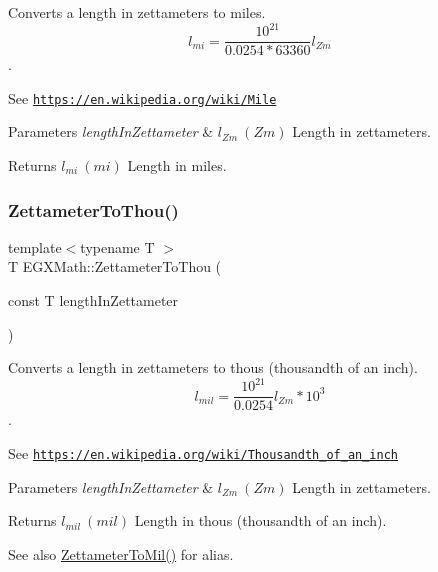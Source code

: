 Converts a length in zettameters to miles. \[ l_{mi}=\frac{10^{21}}{0.0254 * 63360} l_{Zm} \]. 

See \href{https://en.wikipedia.org/wiki/Mile}{\tt https\+://en.\+wikipedia.\+org/wiki/\+Mile} 
\begin{DoxyParams}{Parameters}
{\em length\+In\+Zettameter} & $ l_{Zm}\ (Zm)$ Length in zettameters. \\
\hline
\end{DoxyParams}
\begin{DoxyReturn}{Returns}
$ l_{mi}\ (mi)$ Length in miles. 
\end{DoxyReturn}
\mbox{\label{group___e_g_x_math-_conversions-_length_conversions-_s_i-_zettameter-_imperial_gacd92ac6ab3300ca582966510e369a381}} 
\subsubsection{\texorpdfstring{Zettameter\+To\+Thou()}{ZettameterToThou()}}
{\footnotesize\ttfamily template$<$typename T $>$ \\
T E\+G\+X\+Math\+::\+Zettameter\+To\+Thou (\begin{DoxyParamCaption}\item[{const T}]{length\+In\+Zettameter }\end{DoxyParamCaption})}



Converts a length in zettameters to thous (thousandth of an inch). \[ l_{mil}= \frac{10^{21}}{0.0254} l_{Zm} * 10^{3} \]. 

See \href{https://en.wikipedia.org/wiki/Thousandth_of_an_inch}{\tt https\+://en.\+wikipedia.\+org/wiki/\+Thousandth\+\_\+of\+\_\+an\+\_\+inch} 
\begin{DoxyParams}{Parameters}
{\em length\+In\+Zettameter} & $ l_{Zm}\ (Zm)$ Length in zettameters. \\
\hline
\end{DoxyParams}
\begin{DoxyReturn}{Returns}
$ l_{mil}\ (mil)$ Length in thous (thousandth of an inch). 
\end{DoxyReturn}
\begin{DoxySeeAlso}{See also}
\mbox{\hyperlink{group___e_g_x_math-_conversions-_length_conversions-_s_i-_zettameter-_imperial_gad42b99391f53e56136f2411915c5e28d}{Zettameter\+To\+Mil()}} for alias. 
\end{DoxySeeAlso}
\mbox{\label{group___e_g_x_math-_conversions-_length_conversions-_s_i-_zettameter-_imperial_gaf0f61cf5764afa5022579c2e638a0c2e}} 
